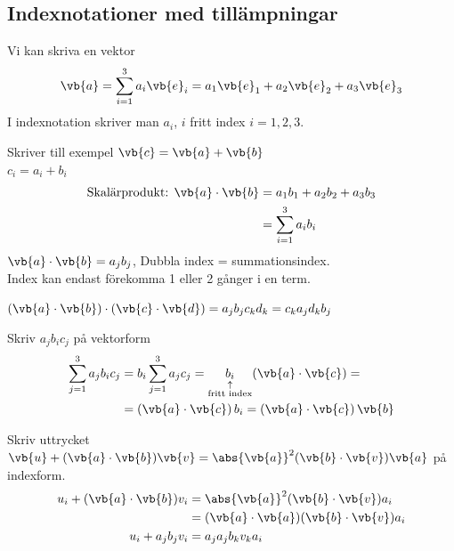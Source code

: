 \subsection{Indexnotationer med tillämpningar}
Vi kan skriva en vektor
\[ \vb{a} = \sum_{i=1}^3 a_i\vb{e}_i = a_1\vb{e}_1 + a_2\vb{e}_2 + a_3\vb{e}_3 \]
I indexnotation skriver man $a_i$, $i$ fritt index $i = 1, 2, 3$.

Skriver till exempel $\vb{c} = \vb{a} + \vb{b}$\\
\phantom{Skriver till exempel} $c_i = a_i + b_i$
\begin{align*}
\text{Skalärprodukt: } \vb{a} \cdot \vb{b} &= a_1 b_1 + a_2 b_2 + a_3 b_3 \\
&= \sum_{i=1}^3 a_i b_i
\end{align*}
$\vb{a} \cdot \vb{b} = a_j b_j$, Dubbla index = summationsindex.\\
Index kan endast förekomma 1 eller 2 gånger i en term.

\begin{example}
$(\vb{a} \cdot \vb{b}) \cdot (\vb{c} \cdot \vb{d}) = a_j b_j c_k d_k = c_k a_j d_k b_j$
\end{example}

\begin{example}[4.1]
Skriv $a_j b_i c_j$ på vektorform
\begin{align*}
\sum_{j=1}^3 a_j b_i c_j &= b_i \sum_{j=1}^3 a_j c_j = \underset{\substack{\uparrow \\ \text{fritt index}}}{b_i}(\vb{a} \cdot \vb{c}) = \\
&= (\vb{a} \cdot \vb{c})\,b_i = (\vb{a} \cdot \vb{c})\,\vb{b}
\end{align*}
\end{example}

\begin{example}[4.2]
Skriv uttrycket $\vb{u} + (\vb{a} \cdot \vb{b})\vb{v} = \abs{\vb{a}}^2(\vb{b} \cdot \vb{v})\vb{a}$ på indexform.
\begin{align*}
u_i + (\vb{a} \cdot \vb{b})v_i &= \abs{\vb{a}}^2(\vb{b} \cdot \vb{v})a_i \\
&= (\vb{a} \cdot \vb{a})(\vb{b} \cdot \vb{v})a_i \\
u_i + a_j b_j v_i &= a_j a_j b_k v_k a_i
\end{align*}
\end{example}
